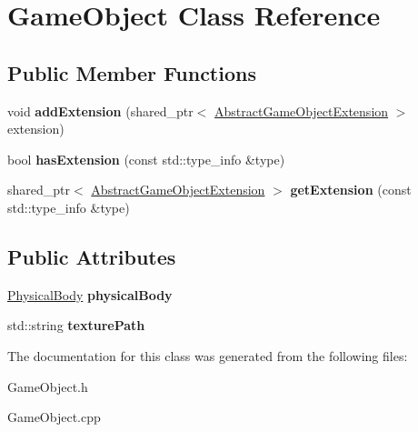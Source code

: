 \hypertarget{class_game_object}{}\section{Game\+Object Class Reference}
\label{class_game_object}
\subsection*{Public Member Functions}
\begin{DoxyCompactItemize}
\item 
\mbox{\label{class_game_object_a8facf0ff97735803de908096859da1f9}} 
void {\bfseries add\+Extension} (shared\+\_\+ptr$<$ \mbox{\hyperlink{class_abstract_game_object_extension}{Abstract\+Game\+Object\+Extension}} $>$ extension)
\item 
\mbox{\label{class_game_object_a611a94761cac7503507c88415d7085f3}} 
bool {\bfseries has\+Extension} (const std\+::type\+\_\+info \&type)
\item 
\mbox{\label{class_game_object_a30f1fa65c3c058952b30ed8a08176d3c}} 
shared\+\_\+ptr$<$ \mbox{\hyperlink{class_abstract_game_object_extension}{Abstract\+Game\+Object\+Extension}} $>$ {\bfseries get\+Extension} (const std\+::type\+\_\+info \&type)
\end{DoxyCompactItemize}
\subsection*{Public Attributes}
\begin{DoxyCompactItemize}
\item 
\mbox{\label{class_game_object_a1171f2f6a12999c18dae12e027fbb7f3}} 
\mbox{\hyperlink{class_physical_body}{Physical\+Body}} {\bfseries physical\+Body}
\item 
\mbox{\label{class_game_object_abdf165736d0533f32dadca6e0e46b809}} 
std\+::string {\bfseries texture\+Path}
\end{DoxyCompactItemize}


The documentation for this class was generated from the following files\+:\begin{DoxyCompactItemize}
\item 
Game\+Object.\+h\item 
Game\+Object.\+cpp\end{DoxyCompactItemize}
